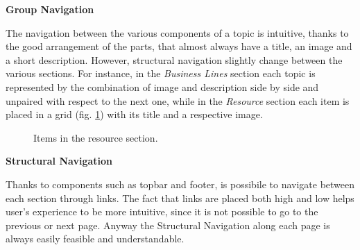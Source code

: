\textbf{Group Navigation}\par
The navigation between the various components of a topic is intuitive, thanks to the good arrangement of the parts, that almost always have a title, an image and a short description. However, structural navigation slightly change between the various sections. For instance, in the \textit{Business Lines} section each topic is represented by the combination of image and description side by side and unpaired with respect to the next one, while in the \textit{Resource} section each item is placed in a grid (fig. \ref{grid}) with its title and a respective image.
\medskip

\begin{figure}[H]

  \centering
    \caption{Items in the resource section.}
    \label{grid}

    
\end{figure}


\textbf{Structural Navigation}\par
Thanks to components such as topbar and footer, is possibile to navigate between each section through links. The fact that links are placed both high and low helps user’s experience to be more intuitive, since it is not possible to go to the previous or next page. Anyway the Structural Navigation along each page is always easily feasible and understandable.
\medskip


\begin{figure}[H]
  \centering
\end{figure}




